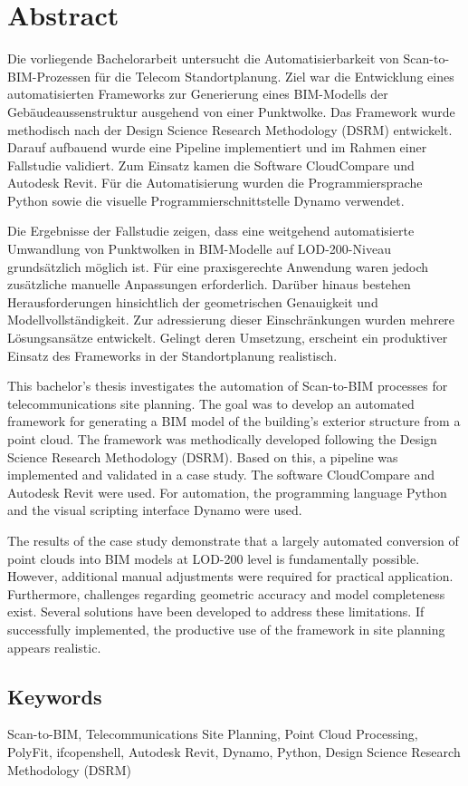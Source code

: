 \chapter*{Abstract}

\begin{German}
    Die vorliegende Bachelorarbeit untersucht die Automatisierbarkeit von Scan-to-BIM-Prozessen für die Telecom Standortplanung. Ziel war die Entwicklung eines automatisierten Frameworks zur Generierung eines BIM-Modells der Gebäudeaussenstruktur ausgehend von einer Punktwolke. Das Framework wurde methodisch nach der Design Science Research Methodology (DSRM) entwickelt. Darauf aufbauend wurde eine Pipeline implementiert und im Rahmen einer Fallstudie validiert. Zum Einsatz kamen die Software CloudCompare und Autodesk Revit. Für die Automatisierung wurden die Programmiersprache Python sowie die visuelle Programmierschnittstelle Dynamo verwendet.

    Die Ergebnisse der Fallstudie zeigen, dass eine weitgehend automatisierte Umwandlung von Punktwolken in BIM-Modelle auf LOD-200-Niveau grundsätzlich möglich ist. Für eine praxisgerechte Anwendung waren jedoch zusätzliche manuelle Anpassungen erforderlich. Darüber hinaus bestehen Herausforderungen hinsichtlich der geometrischen Genauigkeit und Modellvollständigkeit. Zur adressierung dieser Einschränkungen wurden mehrere Lösungsansätze entwickelt. Gelingt deren Umsetzung, erscheint ein produktiver Einsatz des Frameworks in der Standortplanung realistisch.
\end{German}

\begin{English}
    This bachelor's thesis investigates the automation of Scan-to-BIM processes for telecommunications site planning. The goal was to develop an automated framework for generating a BIM model of the building's exterior structure from a point cloud. The framework was methodically developed following the Design Science Research Methodology (DSRM). Based on this, a pipeline was implemented and validated in a case study. The software CloudCompare and Autodesk Revit were used. For automation, the programming language Python and the visual scripting interface Dynamo were used.

    The results of the case study demonstrate that a largely automated conversion of point clouds into BIM models at LOD-200 level is fundamentally possible. However, additional manual adjustments were required for practical application. Furthermore, challenges regarding geometric accuracy and model completeness exist. Several solutions have been developed to address these limitations. If successfully implemented, the productive use of the framework in site planning appears realistic.
\end{English}

\section*{Keywords}
Scan-to-BIM, Telecommunications Site Planning, Point Cloud Processing, PolyFit, ifcopenshell, Autodesk Revit, Dynamo, Python, Design Science Research Methodology (DSRM)